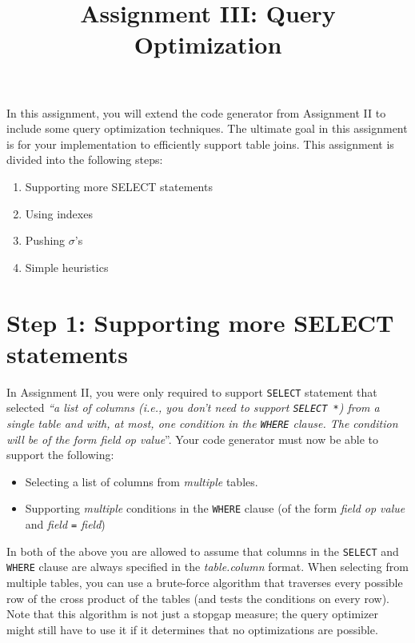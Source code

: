 \documentclass[10pt]{article}
\title{\chidb{} Assignment III: Query Optimization}
\date{}
\begin{document}
\pagestyle{empty}
\maketitle

In this assignment, you will extend the code generator from Assignment II to include some query optimization techniques. The ultimate goal in this assignment is for your implementation to efficiently support table joins. This assignment is divided into the following steps:

\begin{enumerate}
\item Supporting more SELECT statements
\item Using indexes
\item Pushing $\sigma$'s
\item Simple heuristics
\end{enumerate}

\section*{Step 1: Supporting more SELECT statements}

In Assignment II, you were only required to support \texttt{SELECT} statement that selected \emph{``a list of columns (i.e., you don't need to support \texttt{SELECT *}) from a single table and with, at most, one condition in the \texttt{WHERE} clause. The condition will be of the form \emph{field op value}}''. Your code generator must now be able to support the following:

\begin{itemize}
\item Selecting a list of columns from \emph{multiple} tables.
\item Supporting \emph{multiple} conditions in the \texttt{WHERE} clause (of the form \emph{field op value} and \emph{field \texttt{=} field})
\end{itemize}

In both of the above you are allowed to assume that columns in the \texttt{SELECT} and \texttt{WHERE} clause are always specified in the \emph{table.column} format. When selecting from multiple tables, you can use a brute-force algorithm that traverses every possible row of the cross product of the tables (and tests the conditions on every row). Note that this algorithm is not just a stopgap measure; the query optimizer might still have to use it if it determines that no optimizations are possible.
\end{document}

